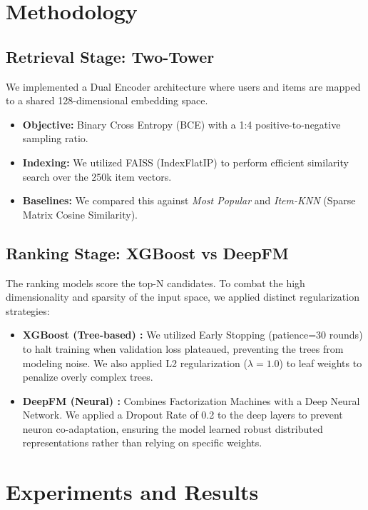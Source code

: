 \documentclass[twocolumn, 10pt, a4paper]{article}
\begin{document}
\section{Methodology}

\subsection{Retrieval Stage: Two-Tower}
We implemented a Dual Encoder architecture \cite{sampling_bias} where users and items are mapped to a shared 128-dimensional embedding space.
\begin{itemize}[noitemsep]
    \item \textbf{Objective:} Binary Cross Entropy (BCE) with a 1:4 positive-to-negative sampling ratio.
    \item \textbf{Indexing:} We utilized FAISS (IndexFlatIP) to perform efficient similarity search over the 250k item vectors.
    \item \textbf{Baselines:} We compared this against \textit{Most Popular} and \textit{Item-KNN} (Sparse Matrix Cosine Similarity).
\end{itemize}

\subsection{Ranking Stage: XGBoost vs DeepFM}
The ranking models score the top-N candidates. To combat the high dimensionality and sparsity of the input space, we applied distinct regularization strategies:

\begin{itemize}
    \item \textbf{XGBoost (Tree-based) \cite{xgboost}:} We utilized Early Stopping (patience=30 rounds) to halt training when validation loss plateaued, preventing the trees from modeling noise. We also applied L2 regularization ($\lambda=1.0$) to leaf weights to penalize overly complex trees.
    \item \textbf{DeepFM (Neural) \cite{deepfm}:} Combines Factorization Machines \cite{rendle_fm} with a Deep Neural Network. We applied a Dropout Rate of 0.2 to the deep layers to prevent neuron co-adaptation, ensuring the model learned robust distributed representations rather than relying on specific weights.
\end{itemize}


\section{Experiments and Results}
\end{document}
